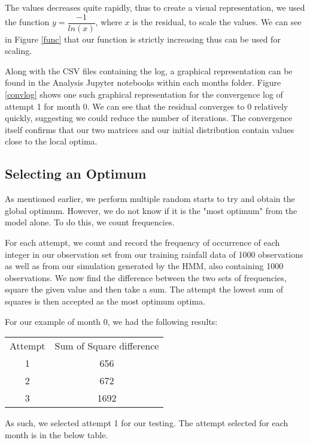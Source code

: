     The values decreases quite rapidly, thus to create a visual representation, we used the function $ y = \dfrac{-1}{ln(x)}$, where $x$ is the residual, to scale the values. We can see in Figure \ref{func} that our function is strictly increasing thus can be used for scaling. 

    Along with the CSV files containing the log, a graphical representation can be found in the Analysis Jupyter notebooks within each months folder. Figure \ref{convlog} shows one such graphical representation for the convergence log of attempt 1 for month 0. We can see that the residual converges to 0 relatively quickly, suggesting we could reduce the number of iterations. The convergence itself confirms that our two matrices and our initial distribution contain values close to the local optima. 

    \subsection{Selecting an Optimum}
    \label{Simple_Rainfall_HMM:Analysis:Selecting_an_Optimum}

    As mentioned earlier, we perform multiple random starts to try and obtain the global optimum. However, we do not know if it is the "most optimum" from the model alone. To do this, we count frequencies. 

    For each attempt, we count and record the frequency of occurrence of each integer in our observation set from our training rainfall data of 1000 observations as well as from our simulation generated by the HMM, also containing 1000 observations. We now find the difference between the two sets of frequencies, square the given value and then take a sum. The attempt the lowest sum of squares is then accepted as the most optimum optima. 

    For our example of month 0, we had the following results:
    \begin{center}
    \begin{tabular}{c c}
        Attempt & Sum of Square difference \\
        1 & 656 \\
        2 & 672 \\
        3 & 1692
    \end{tabular}
    \end{center}

    As such, we selected attempt 1 for our testing. The attempt selected for each month is in the below table.

